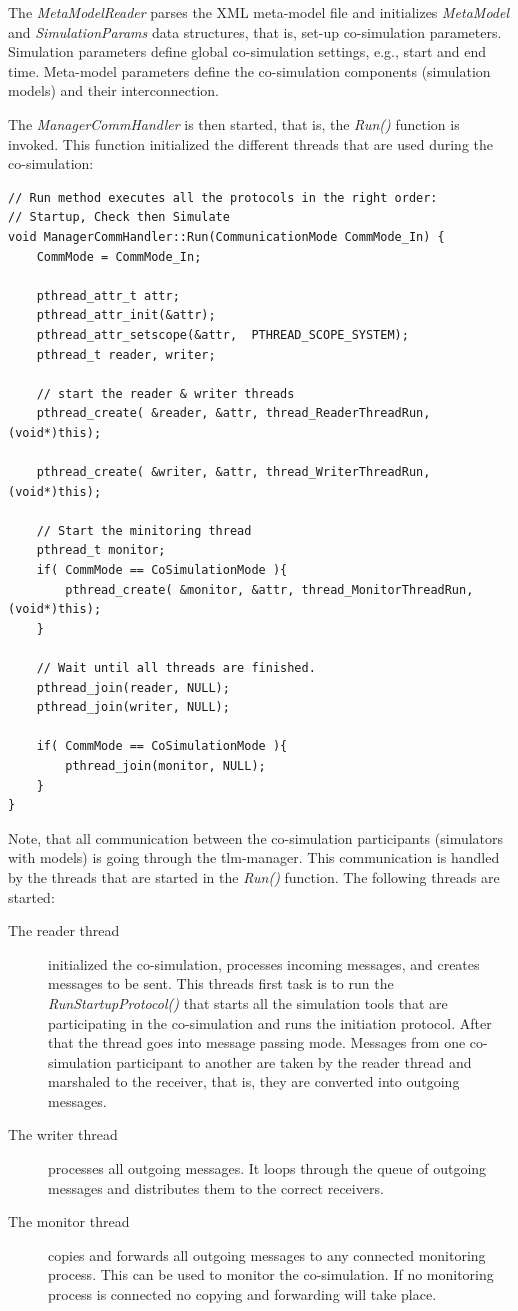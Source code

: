 The {\em MetaModelReader} parses the XML meta-model file and
initializes {\em MetaModel} and {\em SimulationParams} data
structures, that is, set-up co-simulation parameters. Simulation
parameters define global co-simulation settings, e.g., start and end
time. Meta-model parameters define the co-simulation components
(simulation models) and their interconnection.

The {\em ManagerCommHandler} is then started, that is, the {\em Run()}
function is invoked. This function initialized the different threads
that are used during the co-simulation:
{\scriptsize
\begin{verbatim}
// Run method executes all the protocols in the right order:
// Startup, Check then Simulate
void ManagerCommHandler::Run(CommunicationMode CommMode_In) {
    CommMode = CommMode_In;

    pthread_attr_t attr;
    pthread_attr_init(&attr);
    pthread_attr_setscope(&attr,  PTHREAD_SCOPE_SYSTEM);
    pthread_t reader, writer;

    // start the reader & writer threads
    pthread_create( &reader, &attr, thread_ReaderThreadRun, (void*)this);

    pthread_create( &writer, &attr, thread_WriterThreadRun, (void*)this);

    // Start the minitoring thread
    pthread_t monitor;
    if( CommMode == CoSimulationMode ){
        pthread_create( &monitor, &attr, thread_MonitorThreadRun, (void*)this);
    }

    // Wait until all threads are finished.
    pthread_join(reader, NULL);
    pthread_join(writer, NULL);

    if( CommMode == CoSimulationMode ){
        pthread_join(monitor, NULL);
    }
}
\end{verbatim}
}

Note, that all communication between the co-simulation participants
(simulators with models) is going through the tlm-manager. This
communication is handled by the threads that are started in the {\em
  Run()} function. The following threads are started:
\begin{description}
\item[The reader thread] initialized the co-simulation, processes
  incoming messages, and creates messages to be sent. This threads
  first task is to run the {\em RunStartupProtocol()} that starts all
  the simulation tools that are participating in the co-simulation and
  runs the initiation protocol. After that the thread goes into
  message passing mode. Messages from one co-simulation participant to
  another are taken by the reader thread and marshaled to the
  receiver, that is, they are converted into outgoing messages.
\item[The writer thread] processes all outgoing messages. It loops
  through the queue of outgoing messages and distributes them to the
  correct receivers.
\item[The monitor thread] copies and forwards all outgoing messages to
  any connected monitoring process. This can be used to monitor the
  co-simulation. If no monitoring process is connected no copying and
  forwarding will take place.
\end{description}

